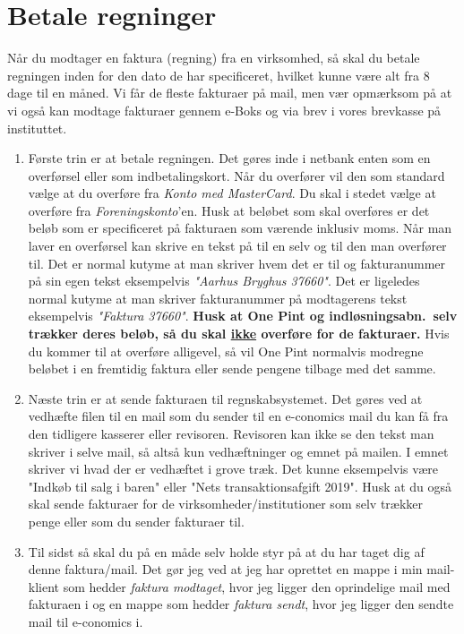 \section{Betale regninger}
Når du modtager en faktura (regning) fra en virksomhed, så skal du betale regningen inden for den dato de har specificeret, hvilket kunne være alt fra 8 dage til en måned. Vi får de fleste fakturaer på mail, men vær opmærksom på at vi også kan modtage fakturaer gennem e-Boks og via brev i vores brevkasse på instituttet.
\begin{enumerate}
    \item Første trin er at betale regningen. Det gøres inde i netbank enten som en
        overførsel eller som indbetalingskort. Når du overfører vil den som standard
        vælge at du overføre fra \textit{Konto med MasterCard}. Du skal i stedet vælge
        at overføre fra \textit{Foreningskonto}'en. Husk at beløbet som skal overføres
        er det beløb som er specificeret på fakturaen som værende inklusiv moms. Når man
        laver en overførsel kan skrive en tekst på til en selv og til den man overfører
        til. Det er normal kutyme at man skriver hvem det er til og fakturanummer på sin
        egen tekst eksempelvis \textit{"Aarhus Bryghus 37660"}. Det er ligeledes normal
        kutyme at man skriver fakturanummer på modtagerens tekst eksempelvis
        \textit{"Faktura 37660"}. \textbf{Husk at One Pint og indløsningsabn.~selv
        trækker deres beløb, så du skal \underline{ikke} overføre for de fakturaer.} Hvis du kommer til at overføre alligevel, så vil One Pint normalvis modregne beløbet i en fremtidig faktura eller sende pengene tilbage med det samme.
    \item Næste trin er at sende fakturaen til regnskabsystemet. Det gøres ved at vedhæfte filen til en mail som du sender til en e-conomics mail du kan få fra den tidligere kasserer eller revisoren. Revisoren kan ikke se den tekst man skriver i selve mail, så altså kun vedhæftninger og emnet på mailen. I emnet skriver vi hvad der er vedhæftet i grove træk. Det kunne eksempelvis være "Indkøb til salg i baren" eller "Nets transaktionsafgift 2019". Husk at du også skal sende fakturaer for de virksomheder/institutioner som selv trækker penge eller som du sender fakturaer til.
    \item Til sidst så skal du på en måde selv holde styr på at du har taget dig af denne faktura/mail. Det gør jeg ved at jeg har oprettet en mappe i min mail-klient som hedder \textit{faktura modtaget}, hvor jeg ligger den oprindelige mail med fakturaen i og en mappe som hedder \textit{faktura sendt}, hvor jeg ligger den sendte mail til e-conomics i.
\end{enumerate}

